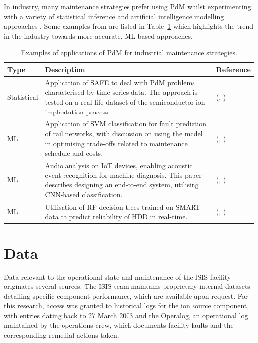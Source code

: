 \documentclass[10pt,oneside]{report}
\renewcommand{\citet}[1]{\citeauthor{#1}, \citeyear{#1}}
\begin{document}
In industry, many maintenance strategies prefer using PdM whilst experimenting with a variety of statistical inference and artificial intelligence modelling approaches \cite{mobley2002introduction, jezzini2013effects}. Some examples from \cite{carvalho2019systematic} are listed in Table~\ref{tab:pdmPaperTable} which highlights the trend in the industry towards more accurate, ML-based approaches.

\begin{table}[htbp]
    \fontsize{8}{12}\selectfont
    \centering
    \begin{adjustbox}{max width=\textwidth}
    \begin{tabular}{p{1.5cm} p{8.5cm} p{3cm}}
        \toprule
        \textbf{Type} & \textbf{Description} & \textbf{Reference} \\
        \midrule
        Statistical & Application of SAFE to deal with PdM problems characterised by time-series data. The approach is tested on a real-life dataset of the semiconductor ion implantation process. & (\citet{susto2016dealing})\\
        ML & Application of SVM classification for fault prediction of rail networks, with discussion on using the model in optimising trade-offs related to maintenance schedule and costs. & (\citet{li2014improving})\\
        ML & Audio analysis on IoT devices, enabling acoustic event recognition for machine diagnosis. This paper describes designing an end-to-end system, utilising CNN-based classification. & (\citet{pan2017cognitive})  \\
        ML & Utilisation of RF decision trees trained on SMART data to predict reliability of HDD in real-time. & (\citet{su2018real}) \\
        \bottomrule
    \end{tabular}
    \end{adjustbox}
    \caption{Examples of applications of PdM for industrial maintenance strategies.}
    \label{tab:pdmPaperTable}
\end{table}

\section{Data}

Data relevant to the operational state and maintenance of the ISIS facility originates several sources. The ISIS team maintains proprietary internal datasets detailing specific component performance, which are available upon request. For this research, access was granted to historical logs for the ion source component, with entries dating back to 27 March 2003 and the Operalog, an operational log maintained by the operations crew, which documents facility faults and the corresponding remedial actions taken.
\end{document}
